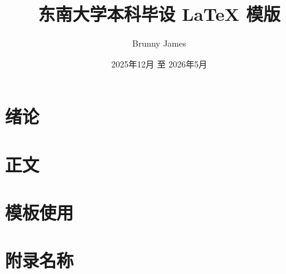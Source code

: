 \documentclass[font dir = {{C:/Windows/Fonts/}}]{seuthesis2026b}
\title{东南大学本科毕设 \LaTeX{} 模版}
\author{Brunny James}
\date{2025年12月 至 2026年5月}
\begin{document}
  \maketitle

  \chapter{绪论}\label{chap:introduction}
    

  \chapter{正文}\label{chap:body}
  

  \chapter{模板使用}\label{chap:usage}
  


  \chapterBib\label{chap:bib}

  \appendix
  \chapter{附录名称}\label{chap:appendix}
  

  \chapterAck
  
\end{document}
